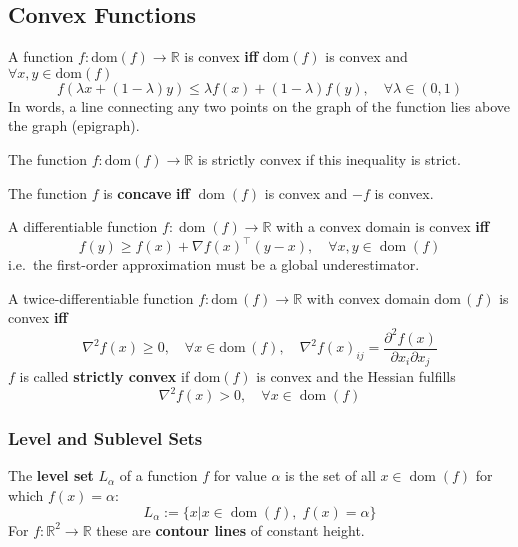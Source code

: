 \subsection{Convex Functions}
A function $f:\text{dom}(f) \rightarrow \mathbb{R}$ is convex \textbf{iff} $\text{dom}(f)$ is convex and $\forall x,y \in \text{dom}(f)$
\begin{equation*}
    f(\lambda x + (1-\lambda)y) \leq \lambda f(x) + (1-\lambda)f(y),\quad \forall \lambda \in (0,1)
\end{equation*}
In words, a line connecting any two points on the graph of the function lies above the graph (epigraph).

\newpar{}
The function $f:\text{dom}(f) \rightarrow \mathbb{R}$ is strictly convex if this inequality is strict.

\newpar{}
The function $f$ is \textbf{concave} \textbf{iff} $\operatorname{dom}(f)$ is convex and $-f$ is convex.

\newpar{}

A differentiable function $f: \operatorname{dom}(f) \to \mathbb{R}$ with a convex domain is convex \textbf{iff}
\begin{equation*}
    f(y) \geq f(x) + \nabla {f(x)}^{\top}(y-x), \quad \forall x, y \in \operatorname{dom}(f)
\end{equation*}
i.e.\ the first-order approximation must be a global underestimator.

\newpar{}

A twice-differentiable function $f : \text{dom}\,(f) \to \mathbb{R}$ with convex domain $\text{dom}\,(f)$ is convex \textbf{iff}
\begin{equation*}
    \nabla^2 f(x) \geq 0, \quad \forall x \in \text{dom}\,(f), \quad \nabla^2 {f(x)}_{ij} = \frac{\partial^2 f(x)}{\partial x_i \partial x_j}
\end{equation*}
\newpar{}
$f$ is called \textbf{strictly convex} if $\text{dom}(f)$ is convex and the Hessian fulfills
\begin{equation*}
    \nabla^2 f(x) > 0, \quad \forall x\in \operatorname{dom}(f)
\end{equation*}

\subsubsection{Level and Sublevel Sets}
The \textbf{level set} $L_{\alpha}$ of a function $f$ for value $\alpha$ is the set of all $x \in \operatorname{dom}(f)$ for which $f(x) = \alpha$:
\begin{equation*}
    L_{\alpha} := \{ x | x \in \operatorname{dom}(f),\; f(x) = \alpha \}
\end{equation*}
\newpar{}
For $f:\mathbb{R}^2 \to \mathbb{R}$ these are \textbf{contour lines} of constant height.

